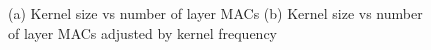 

\begin{figure}
    \centering
    \caption{(a) Kernel size vs number of layer MACs  (b) Kernel size vs number of layer MACs adjusted by kernel frequency}
    \label{fig:kernel_vs_mac}
\end{figure}


